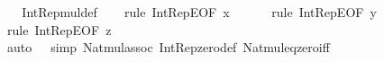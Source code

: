 \begin{isabellebody}
\ \ \isanewline
%
\isadelimproof
\ \ %
\endisadelimproof
%
\isatagproof
{}\isamarkupfalse%
\ Int{\isacharunderscore}{\kern0pt}Rep{\isacharunderscore}{\kern0pt}mul{\isacharunderscore}{\kern0pt}def\isanewline
\ \ \isamarkupfalse%
\ {\isacharparenleft}{\kern0pt}rule\ Int{\isacharunderscore}{\kern0pt}RepE{\isacharbrackleft}{\kern0pt}OF\ {\isacartoucheopen}x\ {\isacharcolon}{\kern0pt}\ {\isacharunderscore}{\kern0pt}{\isacartoucheclose}{\isacharbrackright}{\kern0pt}{\isacharsemicolon}{\kern0pt}\isanewline
\ \ \ \ rule\ Int{\isacharunderscore}{\kern0pt}RepE{\isacharbrackleft}{\kern0pt}OF\ {\isacartoucheopen}y\ {\isacharcolon}{\kern0pt}\ {\isacharunderscore}{\kern0pt}{\isacartoucheclose}{\isacharbrackright}{\kern0pt}{\isacharsemicolon}{\kern0pt}\isanewline
\ \ \ \ rule\ Int{\isacharunderscore}{\kern0pt}RepE{\isacharbrackleft}{\kern0pt}OF\ {\isacartoucheopen}z\ {\isacharcolon}{\kern0pt}\ {\isacharunderscore}{\kern0pt}{\isacartoucheclose}{\isacharbrackright}{\kern0pt}{\isacharparenright}{\kern0pt}\isanewline
\ \ \ \ {\isacharparenleft}{\kern0pt}auto\ {}\ {}\ simp{\isacharcolon}{\kern0pt}\ Nat{\isacharunderscore}{\kern0pt}mul{\isacharunderscore}{\kern0pt}assoc\ Int{\isacharunderscore}{\kern0pt}Rep{\isacharunderscore}{\kern0pt}zero{\isacharunderscore}{\kern0pt}def\ Nat{\isacharunderscore}{\kern0pt}mul{\isacharunderscore}{\kern0pt}eq{\isacharunderscore}{\kern0pt}zero{\isacharunderscore}{\kern0pt}iff{\isacharparenright}{\kern0pt}%
\endisatagproof
{\isafoldproof}%
%
\isadelimproof
\isanewline
%
\endisadelimproof
\isanewline
%
\isadelimtheory
\isanewline
%
\endisadelimtheory
%
\isatagtheory
{}\isamarkupfalse%
%
\endisatagtheory
{\isafoldtheory}%
%
\isadelimtheory
%
\endisadelimtheory
%
\end{isabellebody}%
\endinput

